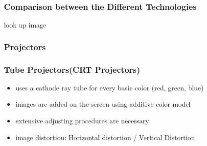 \documentclass{standalone}
\begin{document}
\subsubsection*{Comparison between the Different Technologies}
look up image
\subsubsection{Projectors}
\subsubsection*{Tube Projectors(CRT Projectors)}
\begin{itemize}
\item uses a cathode ray tube for every basic color (red, green, blue)
\item images are added on the screen using additive color model
\item extensive adjusting procedures are necessary
\item image distortion: Horizontal distortion / Vertical Distortion
\end{itemize}
\end{document}
